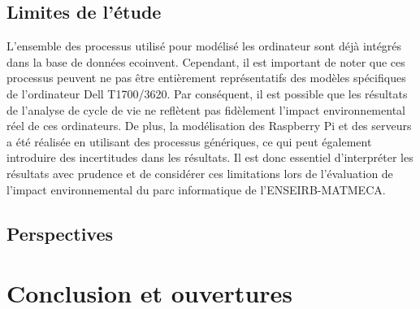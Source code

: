 \documentclass[12pt,a4paper]{paper}
\begin{document}
\subsection{Limites de l'étude}
L'ensemble des processus utilisé pour modélisé les ordinateur sont déjà intégrés dans la base de données ecoinvent. Cependant, il est important de noter que ces processus peuvent ne pas être entièrement représentatifs des modèles spécifiques de l'ordinateur Dell T1700/3620. Par conséquent, il est possible que les résultats de l'analyse de cycle de vie ne reflètent pas fidèlement l'impact environnemental réel de ces ordinateurs. De plus, la modélisation des Raspberry Pi et des serveurs a été réalisée en utilisant des processus génériques, ce qui peut également introduire des incertitudes dans les résultats. Il est donc essentiel d'interpréter les résultats avec prudence et de considérer ces limitations lors de l'évaluation de l'impact environnemental du parc informatique de l'ENSEIRB-MATMECA.
\subsection{Perspectives}
\textcolor{gray}{\lipsum[1-2] }


\section{Conclusion et ouvertures}
\textcolor{gray}{\lipsum[1-2] }
% 

\printbibliography
{}
% 

\appendix
\end{document}
